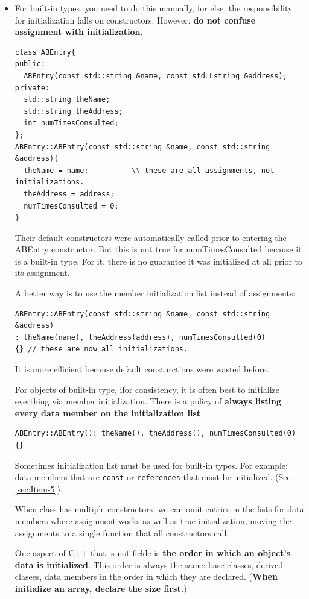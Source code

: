 \documentclass[a4paper,twoside]{article}
\theoremstyle{definition}
\theoremstyle{remark}
\numberwithin{equation}{section}
\let\OldTexttt\texttt
\renewcommand{\texttt}[1]{{\color{blue} \OldTexttt{#1}}}
\begin{document}
\begin{itemize}
\item For built-in types, you need to do this manually, for else,
the responsibility for initialization falls on constructors. However,
\textbf{do not confuse assignment with initialization.}
\begin{verbatim}
class ABEntry{
public:
  ABEntry(const std::string &name, const stdLLstring &address);
private:
  std::string theName;
  std::string theAddress;
  int numTimesConsulted;
};
ABEntry::ABEntry(const std::string &name, const std::string &address){
  theName = name;          \\ these are all assignments, not initializations.
  theAddress = address;
  numTimesConsulted = 0;
}
\end{verbatim}
Their default constructors were automatically called prior to entering
the ABEntry constructor. But this is not true for numTimesConsulted
because it is a built-in type. For it, there is no guarantee it was
initialized at all prior to its assignment.

A better way is to use the member initialization list instead of
assignments:
\begin{verbatim}
ABEntry::ABEntry(const std::string &name, const std::string &address)
: theName(name), theAddress(address), numTimesConsulted(0)
{} // these are now all initializations.
\end{verbatim}
It is more efficient because default consturctions were wasted before.

For objects of built-in type, ifor consistency, it is often best to
initialize everthing via member initialization. There is a policy of
\textbf{always listing every data member on the initialization list}.
\begin{verbatim}
ABEntry::ABEntry(): theName(), theAddress(), numTimesConsulted(0)
{}
\end{verbatim}
Sometimes initialization list must be used for built-in types. For
example: data members that are \texttt{const} or \texttt{references}
that must be initialized. (See \ref{sec:Item-5}).

When class has multiple constructors, we can omit entries in the lists
for data members where assignment works as well as true
initialization, moving the assignments to a single function that all
constructors call.

One aspect of C++ that is not fickle is \textbf{the order in which an
  object's data is initialized}. This order is always the same: base
classes, derived clasees, data members in the order in which they are
declared. (\textbf{When initialize an array, declare the size first.})


\end{itemize}
\end{document}
